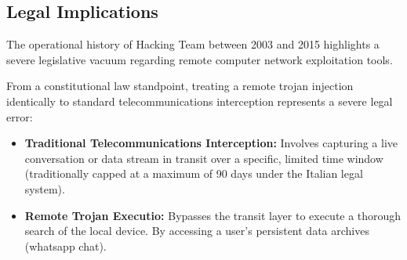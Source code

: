 \subsection{Legal Implications}

The operational history of Hacking Team between 2003 and 2015 highlights a severe legislative vacuum regarding remote computer network exploitation tools.\\
\medskip

\noindent
From a constitutional law standpoint, treating a remote trojan injection identically to standard telecommunications interception represents a severe legal error:
\begin{itemize}
    \item \textbf{Traditional Telecommunications Interception:} Involves capturing a live conversation or data stream in transit over a specific, limited time window (traditionally capped at a maximum of 90 days under the Italian legal system).
    \item \textbf{Remote Trojan Executio:} Bypasses the transit layer to execute a thorough search of the local device. By accessing a user's persistent data archives (whatsapp chat).
\end{itemize}
